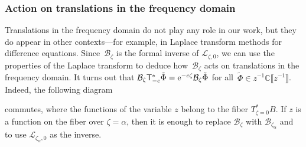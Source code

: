 \documentclass[pdftex]{sigma}
\newcommand{\C}{\mathbb{C}}
\newcommand{\series}[1]{\tilde{#1}}
\newcommand{\laplace}{\mathcal{L}}
\newcommand{\borel}{\mathcal{B}}
\numberwithin{equation}{section}
\begin{document}
\subsubsection{Action on translations in the frequency domain}
Translations in the frequency domain do not play any role in our work, but they do appear in other contexts---for example, in Laplace transform methods for difference equations. Since~$\borel_\zeta$ is the formal inverse of $\laplace_{\zeta,0}$, we can use the properties of the Laplace transform to deduce how~$\borel_\zeta$ acts on translations in the frequency domain. It turns out that
$\borel_\zeta \mathsf{T}_{-c}^* \series{\Phi} = {\rm e}^{-c\zeta }\borel_\zeta \series{\Phi}$
for all~${\series{\Phi} \in z^{-1} \C\big\llbracket z^{-1} \big\rrbracket}$.
Indeed, the following diagram
\begin{center}
\end{center}
commutes, where the functions of the variable $z$ belong to the fiber $T^*_{\zeta=0}B$. If $z$ is a function on the fiber over $\zeta=\alpha$, then it is enough to replace $\borel_\zeta$ with $\borel_{\zeta_\alpha}$ and to use $\laplace_{\zeta_\alpha,0}$ as the inverse.
%
\end{document}
